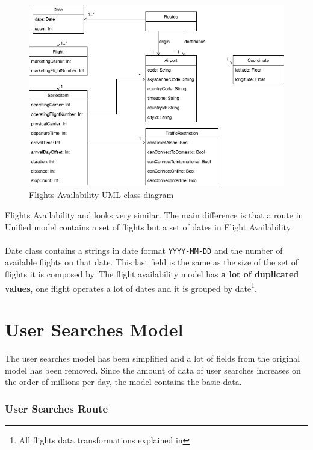 \begin{figure}[H]
\centering
\includegraphics[scale=0.6]{diagrams/flights_availability_model.png}
\caption{Flights Availability UML class diagram}
\end{figure}

Flights Availability and  looks very similar. The main difference is that a route in Unified model contains a set of flights but a set of dates in Flight Availability.
\\\\
Date class contains a strings in date format \texttt{YYYY-MM-DD} and the number of available flights on that date. This last field is the same as the size of the set of flights it is composed by. The flight availability model has \textbf{a lot of duplicated values}, one flight operates a lot of dates and it is grouped by date\footnote{All flights data transformations explained in }.


\section{User Searches Model}

The user searches model has been simplified and a lot of fields from the original model has been removed. Since the amount of data of user searches increases on the order of millions per day, the model contains the basic data.

\subsubsection{User Searches Route}

